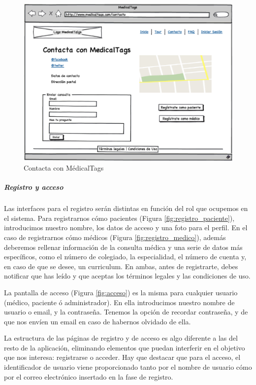 \documentclass[a4paper,oneside,11pt]{book}
\begin{document}
		
		\begin{figure}[H]
		  \centering
		    \includegraphics[width=12cm]{img/eps/6_Contacto.eps}
		  \caption{Contacta con MédicalTags}
		  \label{fig:contacto}
		\end{figure}
	
			
	
		\subparagraph{Registro y acceso} %
			\label{par:registro_y_acceso}
	
			Las interfaces para el registro serán distintas en función del rol que ocupemos en el sistema. Para registrarnos cómo pacientes (Figura \ref{fig:registro_paciente}), introducimos nuestro nombre, los datos de acceso y una foto para el perfil. En el caso de registrarnos cómo médicos (Figura \ref{fig:registro_medico}), además deberemos rellenar información de la consulta médica y una serie de datos más específicos, como el número de colegiado, la especialidad, el número de cuenta y, en caso de que se desee, un curriculum. En ambas, antes de registrarte, debes notificar que has leído y que aceptas los términos legales y las condiciones de uso.
			
			La pantalla de acceso (Figura \ref{fig:acceso}) es la misma para cualquier usuario (médico, paciente ó administrador). En ella introducimos nuestro nombre de usuario o email, y la contraseña. Tenemos la opción de recordar contraseña, y de que nos envíen un email en caso de habernos olvidado de ella.
			
			La estructura de las páginas de registro y de acceso es algo diferente a las del resto de la aplicación, eliminando elementos que puedan interferir en el objetivo que nos interesa: registrarse o acceder. Hay que destacar que para el acceso, el identificador de usuario viene proporcionado tanto por el nombre de usuario cómo por el correo electrónico insertado en la fase de registro.
					
\end{document}
